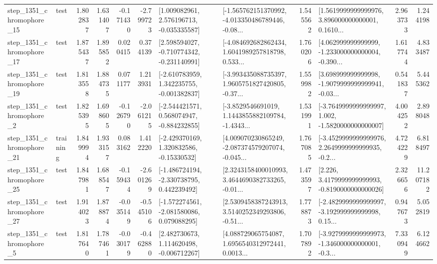 \begin{tabular}{llrrrrllrlrr}
 step\_1351\_chromophore\_15 &      test &      1.802837 &    1.631407 &     -0.171430 & -2.799723 &    [1.009082961, 2.576196713, -0.035335587] &  [-1.565762151370992, -4.013350486789446, -0.08... &       1.545562 &  [1.5619999999999976, 3.896000000000001, 0.1610... &            2.963733 &          1.244198 \\
 step\_1351\_chromophore\_17 &      test &      1.875437 &    1.895852 &      0.020415 &  0.374139 &   [2.598594027, -0.710774342, -0.231140991] &  [-4.084692682862434, 1.6041989257818798, 0.533... &       1.760206 &  [4.062999999999999, -1.233000000000004, -0.390... &            1.617744 &          4.833487 \\
 step\_1351\_chromophore\_19 &      test &      1.813558 &    1.884735 &      0.071177 &  1.213931 &   [-2.610783959, 1.342235755, -0.001382837] &  [-3.993435088735397, 1.9605751827420805, -0.37... &       1.559982 &  [3.698999999999998, -1.9079999999999941, -0.03... &            0.541837 &          5.445362 \\
  step\_1351\_chromophore\_2 &      test &      1.825395 &    1.698605 &     -0.126790 & -2.061215 &   [-2.544421571, 0.568074947, -0.884232855] &  [-3.8529546691019, 1.1443855882109784, -1.4343... &       1.531991 &  [-3.7649999999999997, 1.002, -1.5820000000000007] &            4.004252 &          2.898048 \\
 step\_1351\_chromophore\_21 &  training &      1.849994 &    1.933157 &      0.083162 &  1.412220 &    [-2.429370169, 1.320832586, -0.15330532] &  [4.009070230865249, -2.087374579207074, -0.045... &       1.767085 &  [-3.4529999999999976, 2.2649999999999935, -0.2... &            4.724229 &          6.818497 \\
 step\_1351\_chromophore\_25 &      test &      1.847981 &    1.688547 &     -0.159434 & -2.601269 &   [-1.486724194, -2.330738795, 0.442239492] &  [2.3243158400010993, 3.4644690382733265, -0.01... &       1.473597 &   [2.226, 3.4179999999999993, -0.8190000000000026] &            2.326656 &         11.207182 \\
 step\_1351\_chromophore\_27 &      test &      1.914023 &    1.878874 &     -0.035149 & -0.545106 &   [-1.572274561, -2.081580086, 0.079088295] &  [2.5309458387243913, 3.5140252349293806, -0.51... &       1.778873 &  [-2.4829999999999997, -3.192999999999998, 0.15... &            0.947673 &          5.052819 \\
  step\_1351\_chromophore\_5 &      test &      1.817640 &    1.787461 &     -0.030179 & -0.462880 &    [2.482730673, 1.114620498, -0.006712267] &  [4.088729065754087, 1.6956540312972441, 0.0013... &       1.707892 &  [-3.9279999999999973, -1.346000000000001, -0.3... &            7.330949 &          6.124662 \\

\end{tabular}
